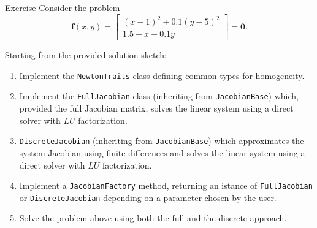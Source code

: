 \documentclass[10pt]{beamer}
\begin{document}
\begin{frame}{Exercise}
Consider the problem
\[
\mathbf{f}(x, y) =
\begin{bmatrix}
(x-1)^2 + 0.1(y - 5)^2 \\
1.5 -x - 0.1y
\end{bmatrix}
=
\mathbf{0}.
\]

Starting from the provided solution sketch:
\begin{enumerate}
\item Implement the \texttt{NewtonTraits} class defining common types for homogeneity.
\item Implement the \texttt{FullJacobian} class (inheriting from \texttt{JacobianBase}) which, provided the full Jacobian matrix, solves the linear system using a direct solver with \(LU\) factorization.
\item \texttt{DiscreteJacobian} (inheriting from \texttt{JacobianBase}) which approximates the system Jacobian using finite differences and solves the linear system using a direct solver with \(LU\) factorization.
\item Implement a \texttt{JacobianFactory} method, returning an istance of \texttt{FullJacobian} or \texttt{DiscreteJacobian} depending on a parameter chosen by the user.
\item Solve the problem above using both the full and the discrete approach.
\end{enumerate}
\end{frame}
\end{document}
